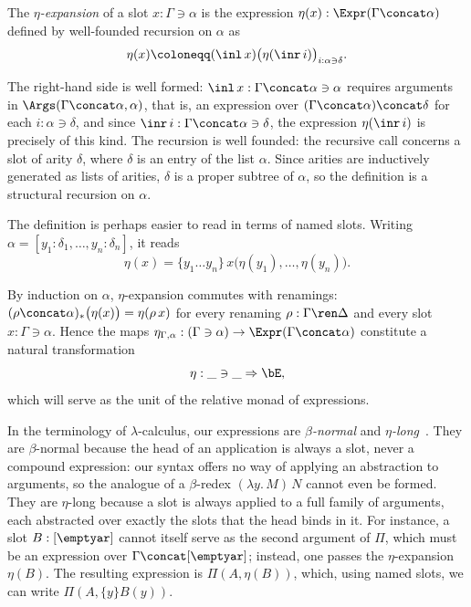 \begin{definition}\label{eta-expansion}
    The \emph{$\eta$-expansion} of a slot $x : \Gamma \ni \alpha$ is the expression $\eta(x) : \Expr(\Gamma \concat \alpha)$ defined by well-founded recursion on $\alpha$ as
    \[
    \eta(x) \coloneqq (\inl\, x)\big(\eta(\inr\, i)\big)_{i : \alpha \ni \delta}.
    \]
\end{definition}

The right-hand side is well formed: $\inl\, x : \Gamma \concat \alpha \ni \alpha$ requires arguments in $\Args(\Gamma \concat \alpha, \alpha)$, that is, an expression over $(\Gamma \concat \alpha) \concat \delta$ for each $i : \alpha \ni \delta$, and since $\inr\, i : \Gamma \concat \alpha \ni \delta$, the expression $\eta(\inr\, i)$ is precisely of this kind.
The recursion is well founded: the recursive call concerns a slot of arity $\delta$, where $\delta$ is an entry of the list $\alpha$. Since arities are inductively generated as lists of arities, $\delta$ is a proper subtree of $\alpha$, so the definition is a structural recursion on $\alpha$.

The definition is perhaps easier to read in terms of named slots. Writing $\alpha = [y_1 : \delta_1, \ldots, y_n : \delta_n]$, it reads
\[
\eta(x) = \{y_1 \ldots y_n\}\, x\big(\eta(y_1), \ldots, \eta(y_n)\big).
\]

By induction on $\alpha$, $\eta$-expansion commutes with renamings: $(\rho \concat \alpha)_*\big(\eta(x)\big) = \eta(\rho\, x)$ for every renaming $\rho : \Gamma \ren \Delta$ and every slot $x : \Gamma \ni \alpha$. Hence the maps $\eta_{\Gamma, \alpha} : (\Gamma \ni \alpha) \to \Expr(\Gamma \concat \alpha)$ constitute a natural transformation
\[
\eta : \_ \ni \_ \Rightarrow \bE,
\]
which will serve as the unit of the relative monad of expressions.

\begin{remark}\label{rem:normal-forms}
    In the terminology of $\lambda$-calculus, our expressions are \emph{$\beta$-normal} and \emph{$\eta$-long}~\cite[\S2]{HarperLicata2007}. They are $\beta$-normal because the head of an application is always a slot, never a compound expression: our syntax offers no way of applying an abstraction to arguments, so the analogue of a $\beta$-redex $(\lambda y.\, M)\, N$ cannot even be formed. They are $\eta$-long because a slot is always applied to a full family of arguments, each abstracted over exactly the slots that the head binds in it.
    For instance, a slot $B : [\emptyar]$ cannot itself serve as the second argument of $\Pi$, which must be an expression over $\Gamma \concat [\emptyar]$; instead, one passes the $\eta$-expansion $\eta(B)$. The resulting expression is $\Pi(A, \eta(B))$, which, using named slots, we can write $\Pi(A, \{y\}B(y))$.
\end{remark}

